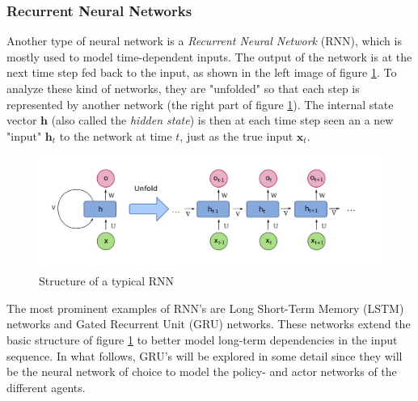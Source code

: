 \subsubsection{Recurrent Neural Networks}
Another type of neural network is a \emph{Recurrent Neural Network} (RNN), which is mostly used to model time-dependent inputs. The output of the network is at the next time step fed back to the input, as shown in the left image of figure \ref{fig:rnn}. To analyze these kind of networks, they are "unfolded" so that each step is represented by another network (the right part of figure \ref{fig:rnn}). The internal state vector $\bm{h}$ (also called the \emph{hidden state}) is then at each time step seen an a new "input" $\bm{h}_t$ to the network at time $t$, just as the true input $\bm{x}_t$.\\
\begin{figure}[htp]
    \centering
    \includegraphics[width=14cm]{images/rnn.png}
    \caption{Structure of a typical RNN}
    \label{fig:rnn}
\end{figure}
The most prominent examples of RNN's are Long Short-Term Memory (LSTM) \cite{hochreiter1997long} networks and Gated Recurrent Unit (GRU) \cite{cho2014learning} networks. These networks extend the basic structure of figure \ref{fig:rnn} to better model long-term dependencies in the input sequence. In what follows, GRU's will be explored in some detail since they will be the neural network of choice to model the policy- and actor networks of the different agents.\\

